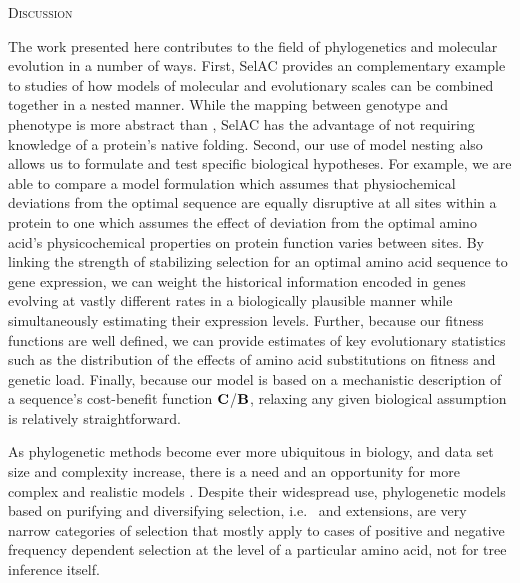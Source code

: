 \documentclass[12pt,letterpaper]{article}
\renewcommand{\section}[1]{%
\bigskip
\begin{center}
\begin{Large}
\normalfont\scshape #1
\medskip
\end{Large}
\end{center}}
\newcommand{\Cost}{\ensuremath{\text{\textbf{C}}}\xspace}
\newcommand{\Func}{\ensuremath{\text{\textbf{B}}}\xspace}
\newcommand{\selac}{SelAC\xspace}
\begin{document}
\section{Discussion}
The work presented here contributes to the field of phylogenetics and molecular evolution in a number of ways.
First, \selac provides an complementary example to \citet{ThorneEtAl2012} studies of how models of molecular and evolutionary scales can be combined together in a nested manner.
While the mapping between genotype and phenotype is more abstract than \citet{ThorneEtAl2012}, \selac has the advantage of not requiring knowledge of a protein's native folding.
Second, our use of model nesting also allows us to formulate and test specific biological hypotheses.
For example, we are able to compare a model formulation which assumes that physiochemical deviations from the optimal sequence are equally disruptive at all sites within a protein to one which assumes the effect of deviation from the optimal amino acid's physicochemical properties on protein function varies between sites.
By linking the strength of stabilizing selection for an optimal amino acid sequence to gene expression, we can weight the historical information encoded in genes evolving at vastly different rates in a biologically plausible manner while simultaneously estimating their expression levels.
Further, because our fitness functions are well defined, we can provide estimates of key evolutionary statistics such as the distribution of the effects of amino acid substitutions on fitness and genetic load.
Finally, because our model is based on a mechanistic description of a sequence's cost-benefit function \Cost/\Func, relaxing any given biological assumption is relatively straightforward.

As phylogenetic methods become ever more ubiquitous in biology, and data set size and complexity increase, there is a need and an opportunity for more complex and realistic models \citep{GoldmanEtAl1996,ThorneEtAl1996,GoldmanEtAl1998,HalpernAndBruno1998,LartillotAndPhilippe2004}.
Despite their widespread use, phylogenetic models based on purifying and diversifying selection, i.e.~\citet{GoldmanAndYang1994} and extensions, are very narrow categories of selection that mostly apply to cases of positive and negative frequency dependent selection at the level of a particular amino acid, not for tree inference itself.
\end{document}
